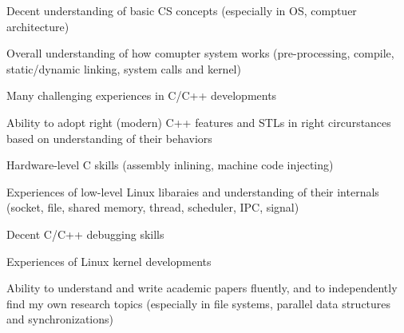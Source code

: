 


\begin{cventries}

\begin{small}
    {
      \begin{cvitems} %
        \item {Decent understanding of basic CS concepts (especially in OS, comptuer architecture)}
	\item {Overall understanding of how comupter system works (pre-processing, compile, static/dynamic linking, system calls and kernel)}
	\item {Many challenging experiences in C/C++ developments}
	\item {Ability to adopt right (modern) C++ features and  STLs in right circurstances based on understanding of their behaviors}
	\item {Hardware-level C skills (assembly inlining, machine code injecting)} 
	\item {Experiences of low-level Linux libaraies and understanding of their internals (socket, file, shared memory, thread, scheduler, IPC, signal)}
	\item {Decent C/C++ debugging skills}
	\item {Experiences of Linux kernel developments}
	\item {Ability to understand and write academic papers fluently, and to independently find my own research topics (especially in file systems, parallel data structures and synchronizations)}
	\newline
      \end{cvitems}
    }
\end{small}

\end{cventries}


